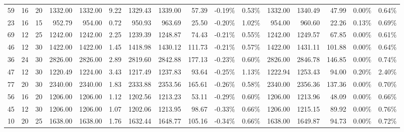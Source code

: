 \begin{tabular}{lllrrrrrrllrrrll}
59 &  16 &  20 &   1332.00 &    1332.00 &        9.22 &       1329.43 &        1339.00 &           57.39 &           -0.19\% &             0.53\% &       1332.00 &        1340.49 &           47.99 &            0.00\% &             0.64\% \\
23 &  16 &  15 &    952.79 &     954.00 &        0.72 &        950.93 &         963.69 &           25.50 &           -0.20\% &             1.02\% &        954.00 &         960.60 &           22.26 &            0.13\% &             0.69\% \\
69 &  12 &  25 &   1242.00 &    1242.00 &        2.25 &       1239.39 &        1248.87 &           74.43 &           -0.21\% &             0.55\% &       1242.00 &        1249.57 &           67.85 &            0.00\% &             0.61\% \\
46 &  12 &  30 &   1422.00 &    1422.00 &        1.45 &       1418.98 &        1430.12 &          111.73 &           -0.21\% &             0.57\% &       1422.00 &        1431.11 &          101.88 &            0.00\% &             0.64\% \\
36 &  24 &  30 &   2826.00 &    2826.00 &        2.89 &       2819.60 &        2842.88 &          177.13 &           -0.23\% &             0.60\% &       2826.00 &        2846.78 &          146.85 &            0.00\% &             0.74\% \\
47 &  12 &  30 &   1220.49 &    1224.00 &        3.43 &       1217.49 &        1237.83 &           93.64 &           -0.25\% &             1.13\% &       1222.94 &        1253.43 &           94.00 &            0.20\% &             2.40\% \\
77 &  20 &  30 &   2340.00 &    2340.00 &        1.83 &       2333.88 &        2353.56 &          165.61 &           -0.26\% &             0.58\% &       2340.00 &        2356.36 &          137.36 &            0.00\% &             0.70\% \\
56 &  16 &  20 &   1206.00 &    1206.00 &        1.12 &       1202.56 &        1213.23 &           53.11 &           -0.29\% &             0.60\% &       1206.00 &        1213.96 &           48.09 &            0.00\% &             0.66\% \\
45 &  12 &  30 &   1206.00 &    1206.00 &        1.07 &       1202.06 &        1213.95 &           98.67 &           -0.33\% &             0.66\% &       1206.00 &        1215.15 &           89.92 &            0.00\% &             0.76\% \\
10 &  20 &  25 &   1638.00 &    1638.00 &        1.76 &       1632.44 &        1648.77 &          105.16 &           -0.34\% &             0.66\% &       1638.00 &        1649.87 &           94.73 &            0.00\% &             0.72\% \\

\end{tabular}
